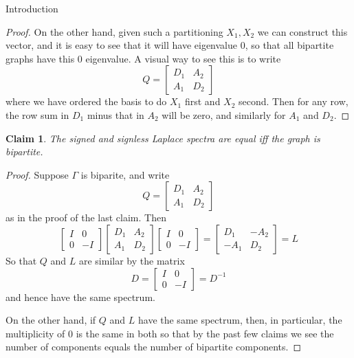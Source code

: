 \documentclass{article}
\newtheorem{claim}{Claim}
\begin{document}
\begin{section}{Introduction}
\begin{proof}
	On the other hand, given such a partitioning $X_1, X_2$ we can construct this vector, and it is easy to see that it will have eigenvalue 0, so that all bipartite graphs have this 0 eigenvalue.
	A visual way to see this is to write
	$$
	Q = \begin{bmatrix}
	  D_1 & A_2\\
	  A_1 & D_2
	\end{bmatrix}
	$$
	where we have ordered the basis to do $X_1$ first and $X_2$ second.
	Then for any row, the row sum in $D_1$ minus that in $A_2$ will be zero, and similarly for $A_1$ and $D_2$.
    \end{proof}
    \begin{claim}
      The signed and signless Laplace spectra are equal iff the graph is bipartite.
    \end{claim}
    \begin{proof}
      Suppose $\Gamma$ is biparite, and write
	$$
	Q = \begin{bmatrix}
	  D_1 & A_2\\
	  A_1 & D_2
	\end{bmatrix}
	$$
	as in the proof of the last claim.
	Then
	$$
        \begin{bmatrix}
	  I & 0\\
	  0 & -I 
	\end{bmatrix}
        \begin{bmatrix}
	  D_1 & A_2\\
	  A_1 & D_2
	\end{bmatrix}
        \begin{bmatrix}
	  I & 0\\
	  0 & -I 
	\end{bmatrix}
	=
        \begin{bmatrix}
	  D_1 & -A_2\\
	  -A_1 & D_2
	\end{bmatrix}
	= L
	$$
	So that $Q$ and $L$ are similar by the matrix
	$$
	D =
        \begin{bmatrix}
	  I & 0\\
	  0 & -I 
	\end{bmatrix}
	= D^{-1}
	$$
	and hence have the same spectrum.

	On the other hand, if $Q$ and $L$ have the same spectrum, then, in particular, the multiplicity of 0 is the same in both so that by the past few claims we see the number of components equals the number of bipartite components.
    \end{proof}


\end{section}
\end{document}
